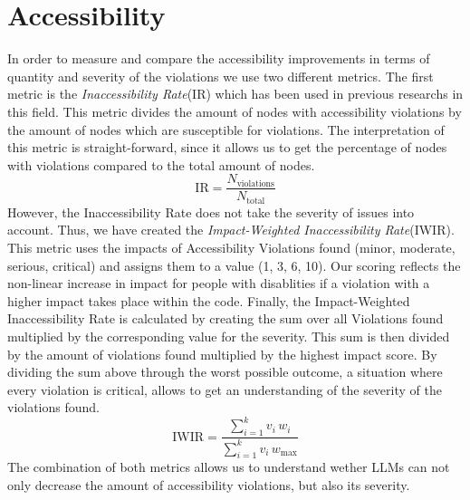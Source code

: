 \section{Accessibility}
In order to measure and compare the accessibility improvements in terms of 
quantity and severity of the violations we use two different metrics.\newline
The first metric is the \textit{Inaccessibility Rate}(IR) which has been used in previous researchs 
in this field. This metric divides the amount of nodes with accessibility violations 
by the amount of nodes which are susceptible for violations. The interpretation of 
this metric is straight-forward, since it allows us to get the percentage of nodes
with violations compared to the total amount of nodes.\newline
\begin{equation}
    \mathrm{IR} = \frac{N_{\mathrm{violations}}}{N_{\mathrm{total}}}
\end{equation}
However, the Inaccessibility Rate does not take the severity of issues into account.
Thus, we have created the \textit{Impact-Weighted Inaccessibility Rate}(IWIR). This metric 
uses the impacts of Accessibility Violations found (minor, moderate, serious, critical)
and assigns them to a value (1, 3, 6, 10). Our scoring reflects the non-linear 
increase in impact for people with disablities if a violation with a higher 
impact takes place within the code. Finally, the Impact-Weighted Inaccessibility Rate 
is calculated by creating the sum over all Violations found multiplied by the 
corresponding value for the severity. This sum is then divided by the amount of violations
found multiplied by the highest impact score. By dividing the sum above through the worst 
possible outcome, a situation where every violation is critical, allows to get an 
understanding of the severity of the violations found.\newline
\begin{equation}
  \mathrm{IWIR} = 
    \frac{\displaystyle\sum_{i=1}^{k} v_i \, w_i}
         {\displaystyle\sum_{i=1}^{k} v_i \, w_{\mathrm{max}}}
  \label{eq:iwir}
\end{equation}
The combination of both metrics allows us to understand wether LLMs can not only decrease
the amount of accessibility violations, but also its severity.


